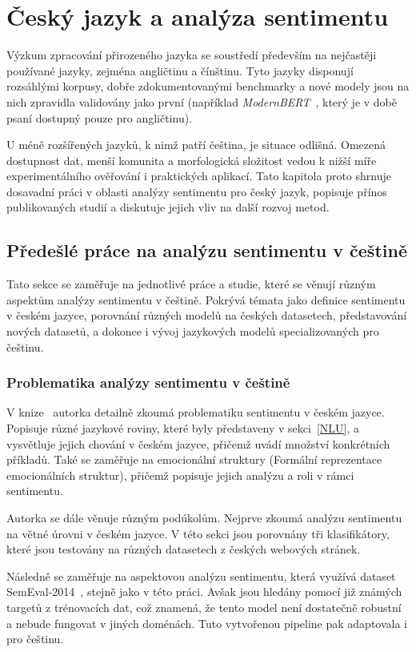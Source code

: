 \chapter{Český jazyk a analýza sentimentu}
Výzkum zpracování přirozeného jazyka se soustředí především na nejčastěji používané jazyky, zejména angličtinu a čínštinu. Tyto jazyky disponují rozsáhlými korpusy, dobře zdokumentovanými benchmarky a nové modely jsou na nich zpravidla validovány jako první (například \emph{ModernBERT}~\cite{warner2024smarterbetterfasterlonger}, který je v době psaní dostupný pouze pro angličtinu).  

U méně rozšířených jazyků, k nimž patří čeština, je situace odlišná. Omezená dostupnost dat, menší komunita a morfologická složitost vedou k nižší míře experimentálního ověřování i praktických aplikací. Tato kapitola proto shrnuje dosavadní práci v oblasti analýzy sentimentu pro český jazyk, popisuje přínos publikovaných studií a diskutuje jejich vliv na další rozvoj metod.

\section{Předešlé práce na analýzu sentimentu v češtině}
Tato sekce se zaměřuje na jednotlivé práce a studie, které se věnují různým aspektům analýzy sentimentu v češtině. Pokrývá témata jako definice sentimentu v českém jazyce, porovnání různých modelů na českých datasetech, představování nových datasetů, a dokonce i vývoj jazykových modelů specializovaných pro češtinu.

\subsection{Problematika analýzy sentimentu v češtině}
V knize~\cite{veselovska-2017} autorka detailně zkoumá problematiku sentimentu v českém jazyce. Popisuje různé jazykové roviny, které byly představeny v sekci~\ref{NLU}, a vysvětluje jejich chování v českém jazyce, přičemž uvádí množství konkrétních příkladů. Také se zaměřuje na emocionální struktury (Formální reprezentace emocionálních struktur), přičemž popisuje jejich analýzu a roli v rámci sentimentu.

Autorka se dále věnuje různým podúkolům. Nejprve zkoumá analýzu sentimentu na větné úrovni v českém jazyce. V této sekci jsou porovnány tři klasifikátory, které jsou testovány na různých datasetech z českých webových stránek.~\cite{veselovska-2017}

Následně se zaměřuje na aspektovou analýzu sentimentu, která využívá dataset SemEval-2014~\cite{pontiki-etal-2014-semeval}, stejně jako v této práci. Avšak  jsou hledány pomocí již známých targetů z trénovacích dat, což znamená, že tento model není dostatečně robustní a nebude fungovat v jiných doménách. Tuto vytvořenou pipeline pak adaptovala i pro češtinu.~\cite{veselovska-2017}

